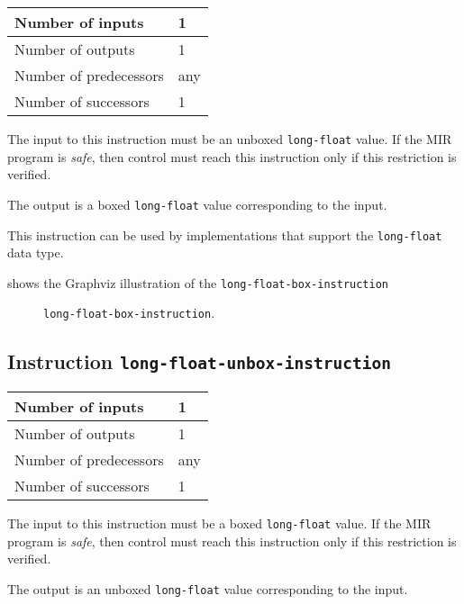 \begin{tabular}{|l|l|}
\hline
Number of inputs & 1\\
\hline
Number of outputs & 1\\
\hline
Number of predecessors & any\\
\hline
Number of successors & 1\\
\hline
\end{tabular}

The input to this instruction must be an unboxed \texttt{long-float}
value.  If the MIR program is \emph{safe}, then control must reach
this instruction only if this restriction is verified.

The output is a boxed \texttt{long-float} value corresponding to the
input.

This instruction can be used by implementations that support the
\texttt{long-float} data type.   

 shows the Graphviz illustration of the
\texttt{long-float-box-instruction}

\begin{figure}
\begin{center}
\end{center}
\caption{\label{fig-long-float-box-instruction}
\texttt{long-float-box-instruction}.}
\end{figure}

\subsection{Instruction \texttt{long-float-unbox-instruction}}
\label{mir-instruction-long-float-unbox}

\begin{tabular}{|l|l|}
\hline
Number of inputs & 1\\
\hline
Number of outputs & 1\\
\hline
Number of predecessors & any\\
\hline
Number of successors & 1\\
\hline
\end{tabular}

The input to this instruction must be a boxed \texttt{long-float}
value.  If the MIR program is \emph{safe}, then control must reach
this instruction only if this restriction is verified.

The output is an unboxed \texttt{long-float} value corresponding to
the input.

